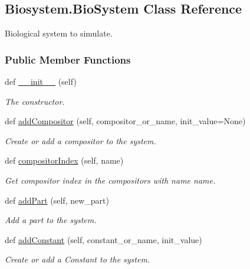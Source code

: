 \hypertarget{classBiosystem_1_1BioSystem}{}\subsection{Biosystem.\+Bio\+System Class Reference}
\label{classBiosystem_1_1BioSystem}


Biological system to simulate.  


\subsubsection*{Public Member Functions}
\begin{DoxyCompactItemize}
\item 
def \hyperlink{classBiosystem_1_1BioSystem_abaf437efe254a2bcaf9d390ff1d26787}{\+\_\+\+\_\+init\+\_\+\+\_\+} (self)
\begin{DoxyCompactList}\small\item\em The constructor. \end{DoxyCompactList}\item 
def \hyperlink{classBiosystem_1_1BioSystem_a3ab704ced27e3561ac54e72d4eb122cb}{add\+Compositor} (self, compositor\+\_\+or\+\_\+name, init\+\_\+value=None)
\begin{DoxyCompactList}\small\item\em Create or add a compositor to the system. \end{DoxyCompactList}\item 
def \hyperlink{classBiosystem_1_1BioSystem_a38bfda2e47e58548852c6fd2c1724de7}{compositor\+Index} (self, name)
\begin{DoxyCompactList}\small\item\em Get compositor index in the {\ttfamily compositors} with name {\ttfamily name}. \end{DoxyCompactList}\item 
def \hyperlink{classBiosystem_1_1BioSystem_a3db2612e36df51bb8d22d9e7207ab46e}{add\+Part} (self, new\+\_\+part)
\begin{DoxyCompactList}\small\item\em Add a part to the system. \end{DoxyCompactList}\item 
def \hyperlink{classBiosystem_1_1BioSystem_ac73c6f3d406e720d2a6bd639e23e71c9}{add\+Constant} (self, constant\+\_\+or\+\_\+name, init\+\_\+value)
\begin{DoxyCompactList}\small\item\em Create or add a Constant to the system. \end{DoxyCompactList}\item 

\end{DoxyCompactItemize}
